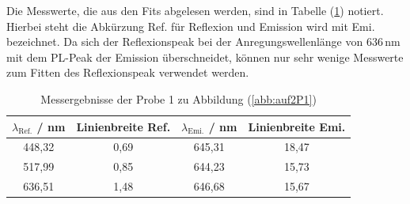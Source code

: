 Die Messwerte, die aus den Fits abgelesen werden, sind in Tabelle (\ref{tab:auf2a}) notiert.
Hierbei steht die Abk\"{u}rzung Ref. f\"{u}r Reflexion und Emission wird mit Emi. bezeichnet.
Da sich der Reflexionspeak bei der Anregungswellenl\"{a}nge von $636 \, \text{nm}$ mit dem PL-Peak der Emission \"{u}berschneidet, k\"{o}nnen nur sehr wenige Messwerte zum Fitten des Reflexionspeak verwendet werden.
\begin{table}
	\centering
	\caption{Messergebnisse der Probe 1 zu Abbildung (\ref{abb:auf2P1})}
\begin{tabular}{|cccc|}
	\hline
	{$\lambda_{\text{Ref.}}$ / nm}	&	{Linienbreite Ref.}	&	{$\lambda_{\text{Emi.}}$ / nm}	&	{Linienbreite Emi.}	\\
	\hline
	448,32 & 0,69 & 645,31 & 18,47 \\
	517,99 & 0,85 & 644,23 & 15,73 \\
	636,51 & 1,48 & 646,68 & 15,67 \\
	\hline
	\end{tabular}
\label{tab:auf2a}
\end{table}

